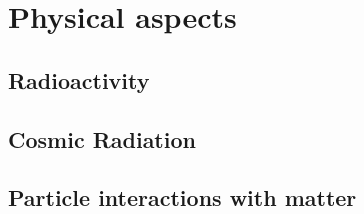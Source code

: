 \chapter{Physical aspects}

\section{Radioactivity}

\section{Cosmic Radiation}

\section{Particle interactions with matter}